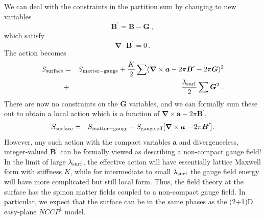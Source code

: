  We can deal with the constraints in the partition sum by changing to new variables
\begin{equation}
{\bm B}^\prime = {\bm B} - {\bm G} ~,
\end{equation}
which satisfy
\begin{equation}
{\bm \nabla} \cdot {\bm B}^\prime = 0 ~.
\end{equation}
The action becomes 
\begin{eqnarray*}
S_{\rm surface} &=& S_{\rm matter-gauge} + \frac{K}{2}\sum  ({\bm\nabla} \times {\bm a}  - 2\pi {\bm B}^\prime - 2\pi {\bm G})^2 \\
 &+& \frac{\lambda_{\rm surf}}{2}\sum  {\bm G}^2 ~.
\end{eqnarray*}
There are now no constraints on the ${\bm G}$ variables, and we can formally sum these out to obtain a local action which is a function of ${\bm\nabla} \times {\bm a} - 2\pi {\bm B}^\prime$,
\begin{eqnarray}
S_{\rm surface} &=& S_{\rm matter-gauge} + S_{\rm gauge, eff}[{\bm\nabla} \times {\bm a}  - 2\pi {\bm B}^\prime] .
\label{partsurface}
\end{eqnarray}
However, any such action with the compact variables ${\bm a}$ and divergenceless, integer-valued ${\bm B}^\prime$ can be formally viewed as describing a non-compact gauge field!  In the limit of large $\lambda_{\rm surf}$, the effective action will have essentially lattice Maxwell form with stiffness $K$, while for intermediate to small $\lambda_{\rm surf}$ the gauge field energy will have more complicated but still local form.  Thus, the field theory at the surface has the spinon matter fields coupled to a non-compact gauge field.  In particular, we expect that the surface can be in the same phases as the (2+1)D easy-plane $NCCP^1$ model.

